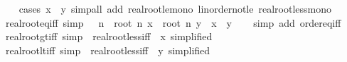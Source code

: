 \begin{isabellebody}
%
\isadelimproof
\ \ %
\endisadelimproof
%
\isatagproof
{}\isamarkupfalse%
\ {\isacharparenleft}{\kern0pt}cases\ {\isachardoublequoteopen}x\ {\isasymle}\ y{\isachardoublequoteclose}{\isacharparenright}{\kern0pt}\ {\isacharparenleft}{\kern0pt}simp{\isacharunderscore}{\kern0pt}all\ add{\isacharcolon}{\kern0pt}\ real{\isacharunderscore}{\kern0pt}root{\isacharunderscore}{\kern0pt}le{\isacharunderscore}{\kern0pt}mono\ linorder{\isacharunderscore}{\kern0pt}not{\isacharunderscore}{\kern0pt}le\ real{\isacharunderscore}{\kern0pt}root{\isacharunderscore}{\kern0pt}less{\isacharunderscore}{\kern0pt}mono{\isacharparenright}{\kern0pt}%
\endisatagproof
{\isafoldproof}%
%
\isadelimproof
\isanewline
%
\endisadelimproof
\isanewline
{}\isamarkupfalse%
\ real{\isacharunderscore}{\kern0pt}root{\isacharunderscore}{\kern0pt}eq{\isacharunderscore}{\kern0pt}iff\ {\isacharbrackleft}{\kern0pt}simp{\isacharbrackright}{\kern0pt}{\isacharcolon}{\kern0pt}\ {\isachardoublequoteopen}{}\ {\isacharless}{\kern0pt}\ n\ {\isasymLongrightarrow}\ root\ n\ x\ {\isacharequal}{\kern0pt}\ root\ n\ y\ {\isasymlongleftrightarrow}\ x\ {\isacharequal}{\kern0pt}\ y{\isachardoublequoteclose}\isanewline
%
\isadelimproof
\ \ %
\endisadelimproof
%
\isatagproof
{}\isamarkupfalse%
\ {\isacharparenleft}{\kern0pt}simp\ add{\isacharcolon}{\kern0pt}\ order{\isacharunderscore}{\kern0pt}eq{\isacharunderscore}{\kern0pt}iff{\isacharparenright}{\kern0pt}%
\endisatagproof
{\isafoldproof}%
%
\isadelimproof
\isanewline
%
\endisadelimproof
\isanewline
{}\isamarkupfalse%
\ real{\isacharunderscore}{\kern0pt}root{\isacharunderscore}{\kern0pt}gt{\isacharunderscore}{\kern0pt}{}{\isacharunderscore}{\kern0pt}iff\ {\isacharbrackleft}{\kern0pt}simp{\isacharbrackright}{\kern0pt}\ {\isacharequal}{\kern0pt}\ real{\isacharunderscore}{\kern0pt}root{\isacharunderscore}{\kern0pt}less{\isacharunderscore}{\kern0pt}iff\ {\isacharbrackleft}{\kern0pt}\ x{\isacharequal}{\kern0pt}{}{\isacharcomma}{\kern0pt}\ simplified{\isacharbrackright}{\kern0pt}\isanewline
{}\isamarkupfalse%
\ real{\isacharunderscore}{\kern0pt}root{\isacharunderscore}{\kern0pt}lt{\isacharunderscore}{\kern0pt}{}{\isacharunderscore}{\kern0pt}iff\ {\isacharbrackleft}{\kern0pt}simp{\isacharbrackright}{\kern0pt}\ {\isacharequal}{\kern0pt}\ real{\isacharunderscore}{\kern0pt}root{\isacharunderscore}{\kern0pt}less{\isacharunderscore}{\kern0pt}iff\ {\isacharbrackleft}{\kern0pt}\ y{\isacharequal}{\kern0pt}{}{\isacharcomma}{\kern0pt}\ simplified{\isacharbrackright}{\kern0pt}\isanewline

\end{isabellebody}

